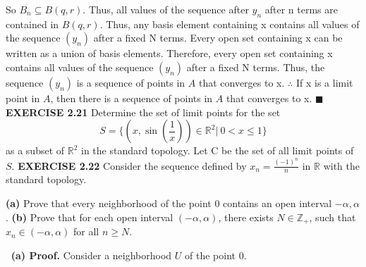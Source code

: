 \documentclass[12pt]{article}
\begin{document}
  \newline
  So \(B_n \subseteq B(q,r)\).
  \newline
  Thus, all values of the sequence after \(y_n\) after n terms are contained in \(B(q,r)\).
  \newline \newline
  Thus, any basis element containing x contains all values of the sequence \((y_n)\) after a fixed N terms.
  \newline
  Every open set containing x can be written as a union of basis elements. \newline
  Therefore, every open set containing x contains all values of the sequence \((y_n)\) after a fixed N terms.
  \newline \newline
  Thus, the sequence \((y_n)\) is a sequence of points in \(A\) that converges to x.
  \newline \newline
  \(\therefore\) If x is a limit point in \(A\), then there is a sequence of points in \(A\) that converges to x.
  \newline \(\blacksquare\)
  \newpage
  \noindent
  \textbf{EXERCISE 2.21}
  Determine the set of limit points for the set
  \[S = \{(x, \sin(\frac{1}{x})) \in \mathbb{R}^2|\ 0 < x \leq 1\}\]
  as a subset of \(\mathbb{R}^2\) in the standard topology.
  \newline \newline
  Let C be the set of all limit points of \(S\).
  \newline
  \newpage
  \noindent
  \textbf{EXERCISE 2.22}
  Consider the sequence defined by \(x_n = \frac{(-1)^n}{n}\) in \(\mathbb{R}\) with the standard topology.
  \newline
  \begin{adjustwidth}{1cm}{0cm}
    \begin{flushleft}
      \textbf{(a)} Prove that every neighborhood of the point 0 contains an open interval \(-\alpha, \alpha\). \newline
      \textbf{(b)} Prove that for each open interval \((-\alpha, \alpha)\), there exists \(N \in \mathbb{Z}_+\), such that \(x_n \in (-\alpha, \alpha)\) for all \(n \geq N\).
    \end{flushleft}
  \end{adjustwidth}
  \(\ \) \newline
  \textbf{(a) Proof.} \newline
  Consider a neighborhood \(U\) of the point 0. \newline
\end{document}
